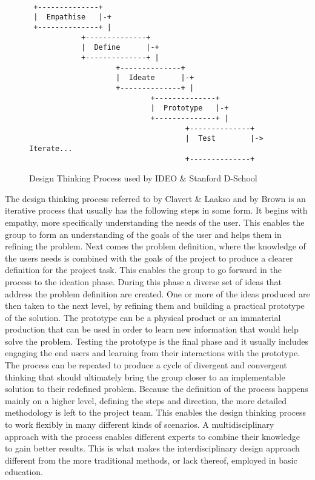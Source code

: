 \documentclass[english,12pt,a4paper,pdftex]{article}
\begin{document}

\begin{figure}[H]
\begin{verbatim}
 
 +--------------+
 |  Empathise   |-+
 +--------------+ |
            +--------------+
            |  Define      |-+
            +--------------+ |
                    +--------------+
                    |  Ideate      |-+
                    +--------------+ |
                            +--------------+
                            |  Prototype   |-+
                            +--------------+ |
                                    +--------------+
                                    |  Test        |-> Iterate...
                                    +--------------+
\end{verbatim}
\caption{Design Thinking Process used by IDEO \& Stanford D-School}
\label{fig:dt-process}
\end{figure}

The design thinking process referred to by Clavert \& Laakso \cite{Clavert} and by Brown \cite{Brown} is an iterative process that usually has the following steps in some form. It begins with empathy, more specifically understanding the needs of the user. This enables the group to form an understanding of the goals of the user and helps them in refining the problem. Next comes the problem definition, where the knowledge of the users needs is combined with the goals of the project to produce a clearer definition for the project task. This enables the group to go forward in the process to the ideation phase. During this phase a diverse set of ideas that address the problem definition are created. One or more of the ideas produced are then taken to the next level, by refining them and building a practical prototype of the solution. The prototype can be a physical product or an immaterial production that can be used in order to learn new information that would help solve the problem. Testing the prototype is the final phase and it usually includes engaging the end users and learning from their interactions with the prototype. \cite{Clavert,Brown} The process can be repeated to produce a cycle of divergent and convergent thinking that should ultimately bring the group closer to an implementable solution to their redefined problem. Because the definition of the process happens mainly on a higher level, defining the steps and direction, the more detailed methodology is left to the project team. This enables the design thinking process to work flexibly in many different kinds of scenarios. A multidisciplinary approach with the process enables different experts to combine their knowledge to gain better results. This is what makes the interdisciplinary design approach different from the more traditional methods, or lack thereof, employed in basic education.
\end{document}
